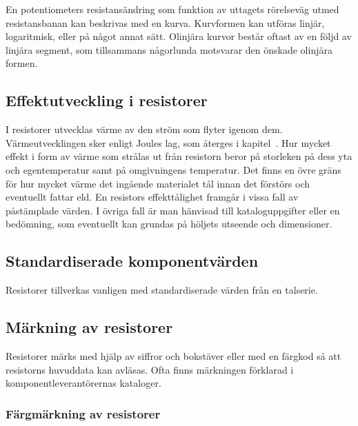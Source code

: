 En potentiometers resistansändring som funktion av uttagets rörelseväg utmed
resistansbanan kan beskrivas med en kurva.
Kurvformen kan utföras linjär, logaritmisk, eller på något annat sätt.
Olinjära kurvor består oftast av en följd av linjära segment, som tillsammans
någorlunda motsvarar den önskade olinjära formen.

\subsection{Effektutveckling i resistorer}

I resistorer utvecklas värme av den ström som flyter igenom dem.
Värmeutvecklingen sker enligt Joules lag, som återges i
kapitel~.
Hur mycket effekt i form av värme som strålas ut från resistorn beror på
storleken på dess yta och egentemperatur samt på omgivningens temperatur.
Det finns en övre gräns för hur mycket värme det ingående materialet tål innan
det förstörs och eventuellt fattar eld.
En resistors effekttålighet framgår i vissa fall av påstämplade värden.
I övriga fall är man hänvisad till kataloguppgifter eller en bedömning, som
eventuellt kan grundas på höljets utseende och dimensioner.

\subsection{Standardiserade komponentvärden}

Resistorer tillverkas vanligen med standardiserade värden från en talserie.

\subsection{Märkning av resistorer}
\label{subsec:faergmaerkning}

Resistorer märks med hjälp av siffror och bokstäver eller med en färgkod så att
resistorns huvuddata kan avläsas.
Ofta finns märkningen förklarad i komponentleverantörernas kataloger.

\subsubsection{Färgmärkning av resistorer}


